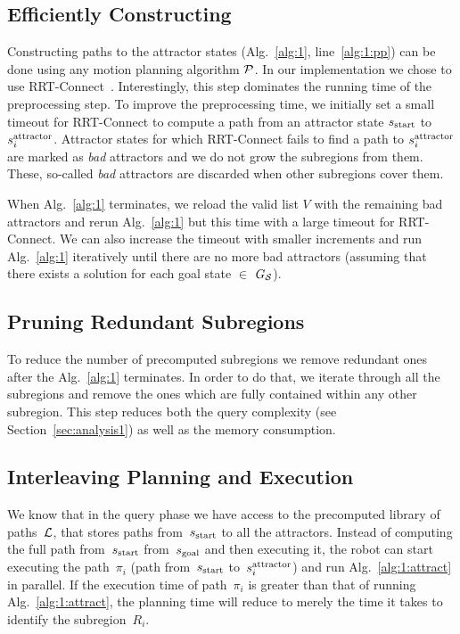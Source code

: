 \documentclass[a4paper]{report}
\begin{document}
\subsection{Efficiently Constructing \calL}
Constructing paths to the attractor states (Alg.~\ref{alg:1}, line~\ref{alg:1:pp}) can be done using any motion planning algorithm $\mathcal{P}$.
In our implementation we chose to use RRT-Connect~\cite{KL00}.
Interestingly, this step dominates the running time of the preprocessing step.
%
To improve the preprocessing time, we initially set a small timeout for RRT-Connect to compute a path from an attractor state $s_{\textrm{start}}$ to $s^{\text{attractor}}_i$.
Attractor states for which RRT-Connect fails to find a path to $s^{\text{attractor}}_i$ are marked as \textit{bad} attractors and we do not grow the subregions from them. 
These, so-called \textit{bad} attractors are discarded when other subregions cover them.

When Alg.~\ref{alg:1} terminates, we reload the valid list $V$ with the remaining bad attractors and rerun Alg.~\ref{alg:1} but this time with a large timeout for RRT-Connect. 
%
We can also increase the timeout with smaller increments and run Alg.~\ref{alg:1} iteratively until there are no more bad attractors (assuming that there exists a solution for each goal state $\in$ $G_\mathcal{S}$).


\subsection{Pruning Redundant Subregions}
To reduce the number of precomputed subregions we remove redundant ones after the Alg.~\ref{alg:1} terminates. 
In order to do that, we iterate through all the subregions and remove the ones which are fully contained within any other subregion. 
This step reduces both the query complexity (see Section~\ref{sec:analysis1}) as well as the memory consumption.

\subsection{Interleaving Planning and Execution}
\label{subsubsec:interleave}
We know that in the query phase we have access to the precomputed library of paths~$\mathcal{L}$, that stores paths from~$s_{\text{start}}$ to all the attractors. Instead of computing the full path from~$s_{\text{start}}$ from~$s_{\text{goal}}$ and then executing it, the robot can start executing the path~$\pi_i$ (path from~$s_{\text{start}}$ to~$s^{\text{attractor}}_i$) and run Alg.~\ref{alg:1:attract} in parallel. If the execution time of path~$\pi_i$ is greater than that of running Alg.~\ref{alg:1:attract}, the planning time will reduce to merely the time it takes to identify the subregion~$R_i$.
\end{document}
